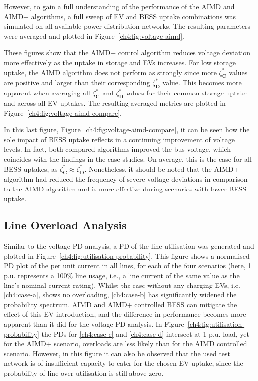 

However, to gain a full understanding of the performance of the AIMD and AIMD+ algorithms, a full sweep of EV and BESS uptake combinations was simulated on all available power distribution networks.
The resulting parameters were averaged and plotted in Figure~\ref{ch4:fig:voltage-aimd}.

These figures show that the AIMD+ control algorithm reduces voltage deviation more effectively as the uptake in storage and EVs increases.
For low storage uptake, the AIMD algorithm does not perform as strongly since more $\zeta_\textbf{C}^{*}$ values are positive and larger than their corresponding $\zeta_\textbf{D}^{*}$ value.
This becomes more apparent when averaging all $\zeta_\textbf{C}^{*}$ and $\zeta_\textbf{D}^{*}$ values for their common storage uptake and across all EV uptakes.
The resulting averaged metrics are plotted in Figure~\ref{ch4:fig:voltage-aimd-compare}.



In this last figure, Figure~\ref{ch4:fig:voltage-aimd-compare}, it can be seen how the sole impact of BESS uptake reflects in a continuing improvement of voltage levels.
In fact, both compared algorithms improved the bus voltage, which coincides with the findings in the case studies.
On average, this is the case for all BESS uptakes, as $\zeta_\textbf{C}^{*} \approx \zeta_\textbf{D}^{*}$.
Nonetheless, it should be noted that the AIMD+ algorithm had reduced the frequency of severe voltage deviations in comparison to the AIMD algorithm and is more effective during scenarios with lower BESS uptake.

\subsection{Line Overload Analysis}



Similar to the voltage PD analysis, a PD of the line utilisation was generated and plotted in Figure~\ref{ch4:fig:utilisation-probability}.
This figure shows a normalised PD plot of the per unit current in all lines, for each of the four scenarios (here, 1 p.u. represents a 100\% line usage, i.e., a line current of the same value as the line's nominal current rating).
Whilst the case without any charging EVs, i.e. \ref{ch4:case-a}, shows no overloading, \ref{ch4:case-b} has significantly widened the probability spectrum.
AIMD and AIMD+ controlled BESS can mitigate the effect of this EV introduction, and the difference in performance becomes more apparent than it did for the voltage PD analysis.
In Figure~\ref{ch4:fig:utilisation-probability} the PDs for \ref{ch4:case-c} and \ref{ch4:case-d} intersect at 1 p.u. load, yet for the AIMD+ scenario, overloads are less likely than for the AIMD controlled scenario.
However, in this figure it can also be observed that the used test network is of insufficient capacity to cater for the chosen EV uptake, since the probability of line over-utilisation is still above zero.


